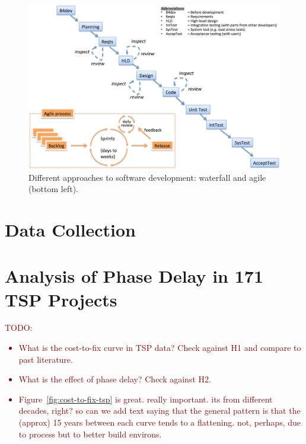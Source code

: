 \documentclass{sig-alternate}
\newcommand{\todo}[1]{\textcolor{Maroon}{TODO: #1}}
\newcommand{\bi}{\begin{itemize}[leftmargin=0.4cm]}
\newcommand{\ei}{\end{itemize}}
\newcommand{\fig}[1]{Figure~\ref{fig:#1}}
\begin{document}







%

 
\begin{figure}[!t]
\begin{center}
\includegraphics[width=6in]{waterfall3.png}
\end{center}
\caption{Different approaches to software development:  waterfall and agile (bottom left).}
\label{fig:waterfall}
\end{figure}

\section{Data Collection}












\section{Analysis of Phase Delay in 171 TSP Projects}

\todo{
\bi
    \item What is the cost-to-fix curve in TSP data? Check against H1 and compare to past literature.
    \item What is the effect of phase delay? Check against H2.
    \item \fig{cost-to-fix-tsp} is great. really important. its from  different decades, right?  so can we add text saying that the general pattern is that the (approx) 15 years between each curve tends to a flattening. not, perhaps, due to process but to better build environs.
\ei
}
\end{document}
